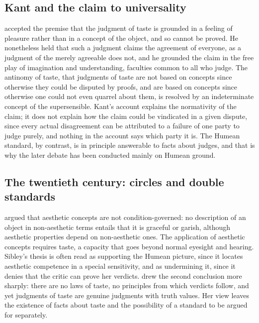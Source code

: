 \documentclass{situationist-preprint}
\begin{document}
\subsection{Kant and the claim to universality}

\citet{Kant1790} accepted the premise that the judgment of taste is grounded in a feeling of pleasure rather than in a concept of the object, and so cannot be proved. He nonetheless held that such a judgment claims the agreement of everyone, as a judgment of the merely agreeable does not, and he grounded the claim in the free play of imagination and understanding, faculties common to all who judge. The antinomy of taste, that judgments of taste are not based on concepts since otherwise they could be disputed by proofs, and are based on concepts since otherwise one could not even quarrel about them, is resolved by an indeterminate concept of the supersensible. Kant's account explains the normativity of the claim; it does not explain how the claim could be vindicated in a given dispute, since every actual disagreement can be attributed to a failure of one party to judge purely, and nothing in the account says which party it is. The Humean standard, by contrast, is in principle answerable to facts about judges, and that is why the later debate has been conducted mainly on Humean ground.

\subsection{The twentieth century: circles and double standards}

\citet{Sibley1959} argued that aesthetic concepts are not condition-governed: no description of an object in non-aesthetic terms entails that it is graceful or garish, although aesthetic properties depend on non-aesthetic ones. The application of aesthetic concepts requires taste, a capacity that goes beyond normal eyesight and hearing. Sibley's thesis is often read as supporting the Humean picture, since it locates aesthetic competence in a special sensitivity, and as undermining it, since it denies that the critic can prove her verdicts. \citet{Mothersill1984} drew the second conclusion more sharply: there are no laws of taste, no principles from which verdicts follow, and yet judgments of taste are genuine judgments with truth values. Her view leaves the existence of facts about taste and the possibility of a standard to be argued for separately.
\end{document}
